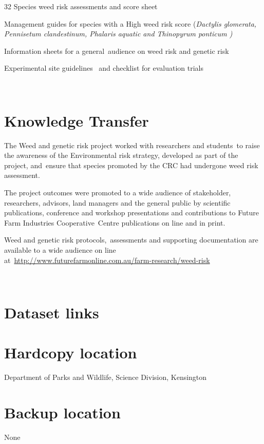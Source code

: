 \documentclass[version=last,
    paper=a4, %
    10pt, %
    usenames,
    dvipsnames,
    oneside, %
    headings=openany, %
    DIV=15 %
]{scrbook}
\begin{document}
32 Species weed risk assessments and score sheet

Management guides for species with a High weed risk score
(\emph{Dactylis glomerata, Pennisetum clandestinum, Phalaris aquatic and
Thinopyrum ponticum )}

Information sheets for a general~audience on weed risk and genetic risk

Experimental site guidelines~ and checklist for evaluation trials

~



\section*{Knowledge Transfer}
The Weed and genetic risk project worked with researchers and
students~to raise the awareness of the Environmental risk strategy,
developed as part of the project, and~ensure that species promoted by
the CRC had undergone weed risk assessment.

The project outcomes were promoted to a wide audience of stakeholder,
researchers, advisors, land managers and the general public by
scientific publications, conference and workshop presentations and
contributions to Future Farm Industries Cooperative~Centre publications
on line and in print.

Weed and genetic risk protocols,~assessments and supporting
documentation are available to a wide audience on line
at~\href{http://www.futurefarmonline.com.au/farm-research/weed-risk}{http://www.futurefarmonline.com.au/farm-research/weed-risk}

~



\section*{Dataset links}




\section*{Hardcopy location}
Department of Parks and Wildlife, Science Division, Kensington



\section*{Backup location}
None



\end{document}
